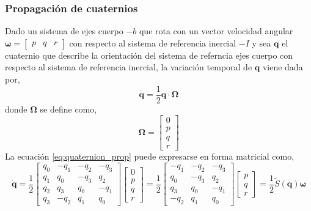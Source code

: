 \documentclass[a4paper,12pt]{book}
\begin{document}
\subsubsection{Propagación de cuaternios}

Dado un sistema de ejes cuerpo $-b$ que rota con un vector velocidad angular $\mathbf{\omega} = \begin{bmatrix} p & q & r\end{bmatrix}$ con respecto al sistema de referencia inercial $-I$ y sea $\mathbf{q}$ el cuaternio que describe la orientación del sistema de referncia ejes cuerpo con respecto al sistema de referencia inercial, la variación temporal de $\mathbf{q}$ viene dada por,
\begin{equation}\label{eq:quaternion_prop}
    \dot{\mathbf{q}} = \frac{1}{2} \mathbf{q\cdot \Omega}
\end{equation}
donde $\mathbf{\Omega}$ se define como,
\begin{equation}
    \mathbf{\Omega} = \begin{bmatrix} 0 \\ p\\q\\r    \end{bmatrix}
\end{equation}
La ecuación \eqref{eq:quaternion_prop} puede expresarse en forma matricial como,
\begin{equation}
    \dot{\mathbf{q}} = \frac{1}{2}\begin{bmatrix}q_0 & -q_1 & -q_2 & -q_3 \\ q_1 & q_0 & -q_3 & q_2 \\ q_2 & q_3 & q_0 & -q_1 \\ q_3 & -q_2 & q_1 & q_0  \end{bmatrix}\begin{bmatrix} 0 \\ p\\q\\r    \end{bmatrix} = \frac{1}{2}\begin{bmatrix} -q_1 & -q_2 & -q_3 \\  q_0 & -q_3 & q_2 \\  q_3 & q_0 & -q_1 \\  -q_2 & q_1 & q_0  \end{bmatrix} \begin{bmatrix}  p\\q\\r    \end{bmatrix} = \frac{1}{2}\tilde{S}(\mathbf{q})\mathbf{\omega}
\end{equation}
\end{document}
